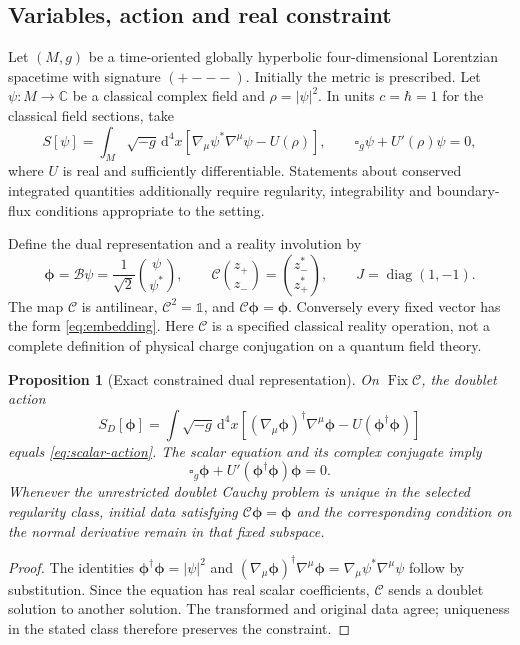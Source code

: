 \documentclass[aip,adv,reprint,onecolumn,amsmath,amssymb]{revtex4-2}
\newcommand{\C}{\mathbb C}
\newcommand{\Id}{\mathbb 1}
\newcommand{\dd}{\mathrm d}
\newcommand{\Ph}{\boldsymbol\phi}
\newcommand{\Jm}{\operatorname{diag}(1,-1)}
\newtheorem{proposition}[theorem]{Proposition}
\begin{document}
\subsection{Variables, action and real constraint}
Let $(M,g)$ be a time-oriented globally hyperbolic four-dimensional Lorentzian spacetime with signature $(+---)$. Initially the metric is prescribed. Let $\psi:M\to\C$ be a classical complex field and $\rho=|\psi|^2$. In units $c=\hbar=1$ for the classical field sections, take
\begin{equation}
 S[\psi]=\int_M\sqrt{-g}\,\dd^4x\left[\nabla_\mu\psi^*\nabla^\mu\psi-U(\rho)\right],\qquad
 \square_g\psi+U'(\rho)\psi=0,
 \label{eq:scalar-action}
\end{equation}
where $U$ is real and sufficiently differentiable. Statements about conserved integrated quantities additionally require regularity, integrability and boundary-flux conditions appropriate to the setting.

Define the dual representation and a reality involution by
\begin{equation}
 \Ph=\mathcal B\psi=\frac1{\sqrt2}\binom{\psi}{\psi^*},\qquad
 \mathcal C\binom{z_+}{z_-}=\binom{z_-^*}{z_+^*},\qquad J=\Jm.
 \label{eq:embedding}
\end{equation}
The map $\mathcal C$ is antilinear, $\mathcal C^2=\Id$, and $\mathcal C\Ph=\Ph$. Conversely every fixed vector has the form \eqref{eq:embedding}. Here $\mathcal C$ is a specified classical reality operation, not a complete definition of physical charge conjugation on a quantum field theory.

\begin{proposition}[Exact constrained dual representation]
On $\operatorname{Fix}\mathcal C$, the doublet action
\begin{equation}
 S_D[\Ph]=\int\sqrt{-g}\,\dd^4x\left[(\nabla_\mu\Ph)^\dagger\nabla^\mu\Ph-U(\Ph^\dagger\Ph)\right]
 \label{eq:doublet-action}
\end{equation}
equals \eqref{eq:scalar-action}. The scalar equation and its complex conjugate imply
\begin{equation}
 \square_g\Ph+U'(\Ph^\dagger\Ph)\Ph=0.
 \label{eq:doublet-pde}
\end{equation}
Whenever the unrestricted doublet Cauchy problem is unique in the selected regularity class, initial data satisfying $\mathcal C\Ph=\Ph$ and the corresponding condition on the normal derivative remain in that fixed subspace.
\end{proposition}
\begin{proof}
The identities $\Ph^\dagger\Ph=|\psi|^2$ and $(\nabla_\mu\Ph)^\dagger\nabla^\mu\Ph=\nabla_\mu\psi^*\nabla^\mu\psi$ follow by substitution. Since the equation has real scalar coefficients, $\mathcal C$ sends a doublet solution to another solution. The transformed and original data agree; uniqueness in the stated class therefore preserves the constraint.
\end{proof}
\end{document}
